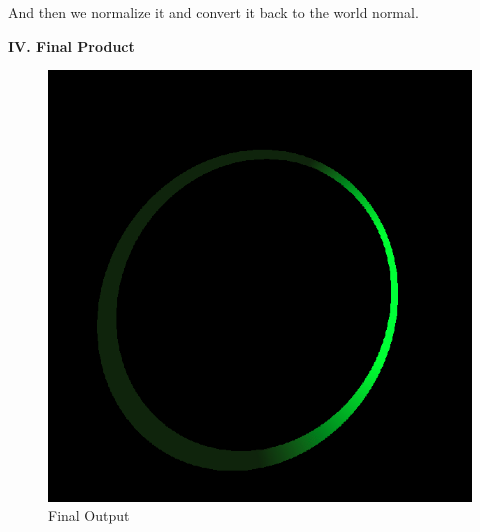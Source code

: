 \documentclass[a4paper,12pt]{report}
\begin{document}
And then we normalize it and convert it back to the world normal. 

\pagebreak
\textbf{IV. Final Product}
\begin{figure}[h]
\centering
\includegraphics[scale=0.5]{./Pic/Torus6.png}
\caption{Final Output}
\end{figure}
\end{document}

